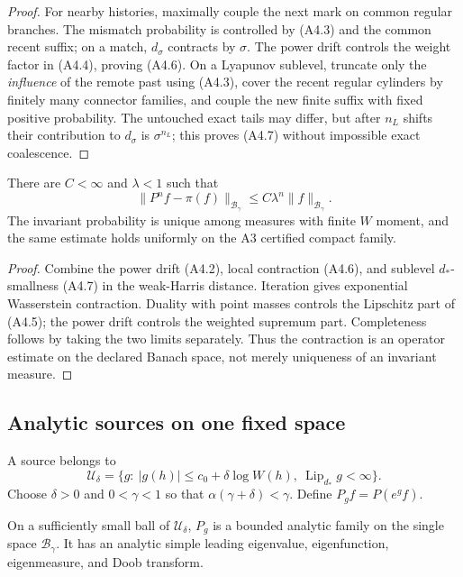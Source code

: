 \begin{proof}
For nearby histories, maximally couple the next mark on common regular
branches.  The mismatch probability is controlled by (A4.3) and the common
recent suffix; on a match, $d_\sigma$ contracts by $\sigma$.  The power drift
controls the weight factor in (A4.4), proving (A4.6).  On a Lyapunov sublevel,
truncate only the \emph{influence} of the remote past using (A4.3), cover the
recent regular cylinders by finitely many connector families, and couple the
new finite suffix with fixed positive probability.  The untouched exact tails
may differ, but after $n_L$ shifts their contribution to $d_\sigma$ is
$\sigma^{n_L}$; this proves (A4.7) without impossible exact coalescence.
\end{proof}

\begin{theorem}
\label{thm:r27-a4-harris}
There are $C<\infty$ and $\lambda<1$ such that
\[
 \|P^nf-\pi(f)\|_{\mathcal B_\gamma}
 \le C\lambda^n\|f\|_{\mathcal B_\gamma}.                 \tag{A4.8}
\]
The invariant probability is unique among measures with finite $W$ moment,
and the same estimate holds uniformly on the A3 certified compact family.
\end{theorem}

\begin{proof}
Combine the power drift (A4.2), local contraction (A4.6), and sublevel
$d_*$-smallness (A4.7) in the weak-Harris distance.  Iteration gives
exponential Wasserstein contraction.  Duality with point masses controls the
Lipschitz part of (A4.5); the power drift controls the weighted supremum part.
Completeness follows by taking the two limits separately.  Thus the
contraction is an operator estimate on the declared Banach space, not merely
uniqueness of an invariant measure.
\end{proof}

\subsection{Analytic sources on one fixed space}

A source belongs to
\[
 \mathcal U_\delta=\{g:\ |g(h)|\le c_0+\delta\log W(h),\
             \operatorname{Lip}_{d_*}g<\infty\}.
\]
Choose $\delta>0$ and $0<\gamma<1$ so that
$\alpha(\gamma+\delta)<\gamma$.  Define
$P_gf=P(e^gf)$.

\begin{theorem}
\label{thm:r27-a4-fk}
On a sufficiently small ball of $\mathcal U_\delta$, $P_g$ is a bounded
analytic family on the single space $\mathcal B_\gamma$.  It has an analytic
simple leading eigenvalue, eigenfunction, eigenmeasure, and Doob transform.
\end{theorem}

